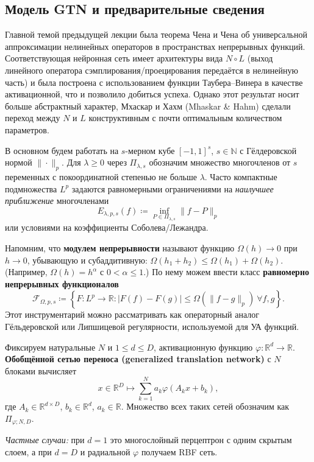 \documentclass[../NDCNNAI_main.tex]{subfiles}
\begin{document}
\subsection{Модель GTN и предварительные сведения}
Главной темой предыдущей лекции была теорема Чена и Чена об универсальной аппроксимации нелинейных операторов в пространствах непрерывных функций.
Соответствующая нейронная сеть имеет архитектуры вида $N \circ L$ (выход линейного оператора сэмплирования/проецирования передаётся в нелинейную часть) и была построена с использованием функции Таубера--Винера в качестве активационной, что и позволило добиться успеха.
Однако этот результат носит больше абстрактный характер, Мхаскар и Хахм (Mhaskar \& Hahm) сделали переход между $N$ и $L$ конструктивным с почти оптимальным количеством параметров.

В основном будем работать на $s$-мерном кубе $[-1, 1]^s$, $s \in \mathbb{N}$ с Гёлдеровской нормой $\|\cdot\|_p$.
Для $\lambda \ge 0$ через $\Pi_{\lambda,s}$ обозначим множество многочленов от $s$ переменных с покоординатной степенью не больше $\lambda$.
Часто компактные подмножества $L^p$ задаются равномерными ограничениями на \emph{наилучшее приближение} многочленами
$$E_{\lambda,p,s}(f) \coloneq \inf_{P \in \Pi_{\lambda,s}} \|f - P\|_p$$
или условиями на коэффициенты Соболева/Лежандра.

Напомним, что \textbf{модулем непрерывности} называют функцию $\Omega(h) \to 0$ при $h \to 0$, убывающую и субаддитивную: $\Omega(h_1 + h_2) \le \Omega(h_1) + \Omega(h_2)$. (Например, $\Omega(h) = h^\alpha$ с $0 < \alpha \le 1$.)
По нему можем ввести класс \textbf{равномерно непрерывных функционалов}
$$\mathcal{F}_{\Omega,p,s} \coloneq \left\{ F\colon L^p \to \mathbb{R} : |F(f) - F(g)| \le \Omega(\|f - g\|_p) \ \forall f,g \right\}.$$
Этот инструментарий можно рассматривать как операторный аналог Гёльдеровской или Липшицевой регулярности, используемой для УА функций.
\begin{definition}
  Фиксируем натуральные $N$ и $1 \le d \le D$, активационную функцию $\varphi \colon \mathbb{R}^d \to \mathbb{R}$.
  \textbf{Обобщённой сетью переноса (generalized translation network)} с $N$ блоками вычисляет
  $$x \in \mathbb{R}^{D} \longmapsto \sum_{k=1}^{N} a_k \varphi(A_k x + b_k),$$
  где $A_k \in \mathbb{R}^{d \times D}$, $b_k \in \mathbb{R}^d$, $a_k \in \mathbb{R}$.
  Множество всех таких сетей обозначим как $\Pi_{\varphi;N,D}$.
\end{definition}
\textit{Частные случаи:} при $d = 1$ это многослойный перцептрон с одним скрытым слоем, а при $d = D$ и радиальной $\varphi$ получаем RBF сеть.
\end{document}
